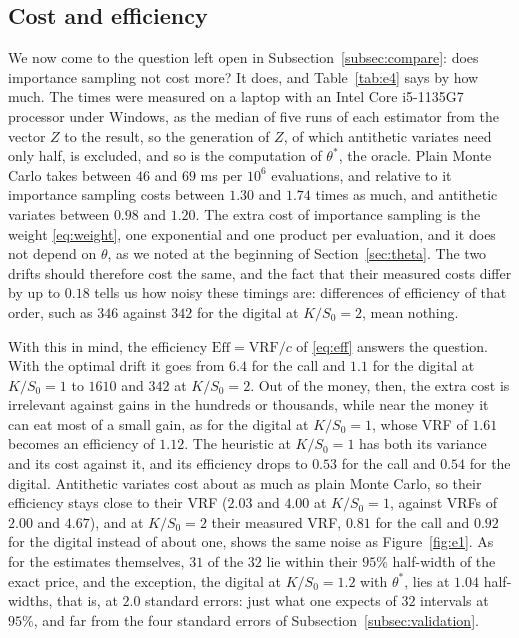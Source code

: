 \documentclass[11pt,a4paper]{article}
\theoremstyle{plain}
\theoremstyle{definition}
\theoremstyle{remark}
\newcommand{\1}{\mathbf{1}}
\newcommand{\VRF}{\mathrm{VRF}}
\newcommand{\Eff}{\mathrm{Eff}}
\begin{document}
\subsection{Cost and efficiency}
\label{subsec:cost}

We now come to the question left open in Subsection~\ref{subsec:compare}: does importance sampling not cost more? It does, and Table~\ref{tab:e4} says by how much. The times were measured on a laptop with an Intel Core i5-1135G7 processor under Windows, as the median of five runs of each estimator from the vector $Z$ to the result, so the generation of $Z$, of which antithetic variates need only half, is excluded, and so is the computation of $\theta^*$, the oracle. Plain Monte Carlo takes between $46$ and $69$ ms per $10^6$ evaluations, and relative to it importance sampling costs between $1.30$ and $1.74$ times as much, and antithetic variates between $0.98$ and $1.20$. The extra cost of importance sampling is the weight \eqref{eq:weight}, one exponential and one product per evaluation, and it does not depend on $\theta$, as we noted at the beginning of Section~\ref{sec:theta}. The two drifts should therefore cost the same, and the fact that their measured costs differ by up to $0.18$ tells us how noisy these timings are: differences of efficiency of that order, such as $346$ against $342$ for the digital at $K/S_0 = 2$, mean nothing.

With this in mind, the efficiency $\Eff = \VRF/c$ of \eqref{eq:eff} answers the question. With the optimal drift it goes from $6.4$ for the call and $1.1$ for the digital at $K/S_0 = 1$ to $1610$ and $342$ at $K/S_0 = 2$. Out of the money, then, the extra cost is irrelevant against gains in the hundreds or thousands, while near the money it can eat most of a small gain, as for the digital at $K/S_0 = 1$, whose VRF of $1.61$ becomes an efficiency of $1.12$. The heuristic at $K/S_0 = 1$ has both its variance and its cost against it, and its efficiency drops to $0.53$ for the call and $0.54$ for the digital. Antithetic variates cost about as much as plain Monte Carlo, so their efficiency stays close to their VRF ($2.03$ and $4.00$ at $K/S_0 = 1$, against VRFs of $2.00$ and $4.67$), and at $K/S_0 = 2$ their measured VRF, $0.81$ for the call and $0.92$ for the digital instead of about one, shows the same noise as Figure~\ref{fig:e1}. As for the estimates themselves, $31$ of the $32$ lie within their $95\%$ half-width of the exact price, and the exception, the digital at $K/S_0 = 1.2$ with $\theta^*$, lies at $1.04$ half-widths, that is, at $2.0$ standard errors: just what one expects of $32$ intervals at $95\%$, and far from the four standard errors of Subsection~\ref{subsec:validation}.
\end{document}

